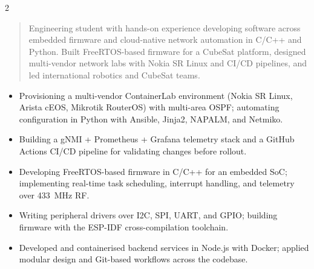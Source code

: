 \documentclass[10pt,a4paper,ragged2e,withhyper]{altacv}
\begin{document}
\begin{paracol}{2}

        \newpage

        \switchcolumn

            \begin{quote}
            Engineering student with hands-on experience developing software across embedded firmware and cloud-native network automation in C/C++ and Python. Built FreeRTOS-based firmware for a CubeSat platform, designed multi-vendor network labs with Nokia SR Linux and CI/CD pipelines, and led international robotics and CubeSat teams.
            \end{quote}

            \begin{itemize}
                \item Provisioning a multi-vendor ContainerLab environment (Nokia SR Linux, Arista cEOS, Mikrotik RouterOS) with multi-area OSPF; automating configuration in Python with Ansible, Jinja2, NAPALM, and Netmiko.
                \item Building a gNMI + Prometheus + Grafana telemetry stack and a GitHub Actions CI/CD pipeline for validating changes before rollout.
            \end{itemize}

            \begin{itemize}
                \item Developing FreeRTOS-based firmware in C/C++ for an embedded SoC; implementing real-time task scheduling, interrupt handling, and telemetry over 433~MHz RF.
                \item Writing peripheral drivers over I2C, SPI, UART, and GPIO; building firmware with the ESP-IDF cross-compilation toolchain.
            \end{itemize}

            \begin{itemize}
                \item Developed and containerised backend services in Node.js with Docker; applied modular design and Git-based workflows across the codebase.
            \end{itemize}
            \divider


\end{paracol}
\end{document}
